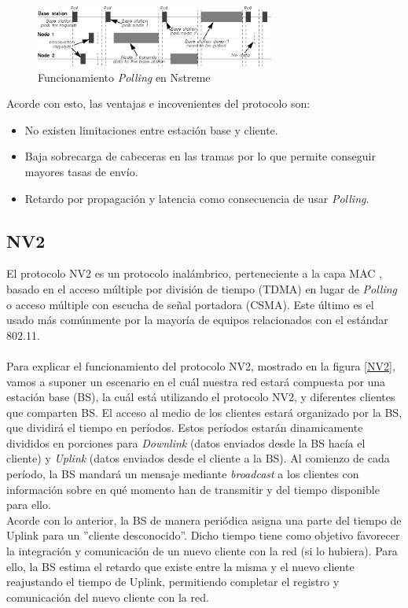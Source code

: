 		\begin{figure}[H]
			\centering
			\includegraphics[width=0.7\textwidth]{img/Polling.png}
			\caption{Funcionamiento \textit{Polling} en Nstreme}
			\label{Nstreme}
		\end{figure}
		
		Acorde con esto, las ventajas e incovenientes del protocolo son:
		\begin{itemize}
			\item No existen limitaciones entre estación base y cliente.
			\item Baja sobrecarga de cabeceras en las tramas por lo que permite conseguir mayores tasas de envío.
			\item Retardo por propagación y latencia como consecuencia de usar \textit{Polling}.
		\end{itemize}

		\subsection{NV2}
		El protocolo NV2 es un protocolo inalámbrico, perteneciente a la capa MAC \cite{MacLayer}, basado en el acceso múltiple por división de tiempo (TDMA) en lugar de \textit{Polling} o acceso múltiple con escucha de señal portadora (CSMA). Este último es el usado más comúnmente por la mayoría de equipos relacionados con el estándar 802.11.\\\\
		
		Para explicar el funcionamiento del protocolo NV2, mostrado en la figura \ref{NV2}, vamos a suponer un escenario en el cuál nuestra red estará compuesta por una estación base (BS), la cuál está utilizando el protocolo NV2, y diferentes clientes que comparten BS. El acceso al medio de los clientes estará organizado por la BS, que dividirá el tiempo en períodos. Estos períodos estarán dinamicamente divididos en porciones para \textit{Downlink} (datos enviados desde la BS hacía el cliente) y \textit{Uplink} (datos enviados desde el cliente a la BS). Al comienzo de cada período, la BS mandará un mensaje mediante \textit{broadcast} a los clientes con información sobre en qué momento han de transmitir y del tiempo disponible para ello. \\
		Acorde con lo anterior, la BS de manera periódica asigna una parte del tiempo de Uplink para un ''cliente desconocido''. Dicho tiempo tiene como objetivo favorecer la integración y comunicación de un nuevo cliente con la red (si lo hubiera). Para ello, la BS estima el retardo que existe entre la misma y el nuevo cliente reajustando el tiempo de Uplink, permitiendo completar el registro y comunicación del nuevo cliente con la red.
		
